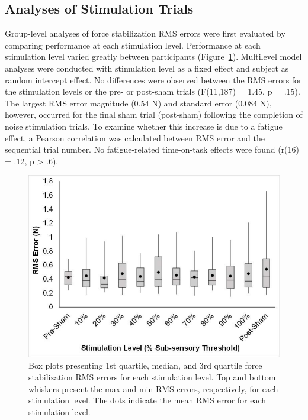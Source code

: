 \documentclass[]{cik}%
\begin{document}
\hypertarget{analyses-of-stimulation-trials}{%
\subsection{Analyses of Stimulation
Trials}\label{analyses-of-stimulation-trials}}

Group-level analyses of force stabilization RMS errors were first
evaluated by comparing performance at each stimulation level.
Performance at each stimulation level varied greatly between
participants (Figure~\ref{fig-3}). Multilevel model analyses were
conducted with stimulation level as a fixed effect and subject as random
intercept effect. No differences were observed between the RMS errors
for the stimulation levels or the pre- or post-sham trials (F(11,187) =
1.45, p = .15). The largest RMS error magnitude (0.54 N) and standard
error (0.084 N), however, occurred for the final sham trial (post-sham)
following the completion of noise stimulation trials. To examine whether
this increase is due to a fatigue effect, a Pearson correlation was
calculated between RMS error and the sequential trial number. No
fatigue-related time-on-task effects were found (r(16) = .12, p
\textgreater{} .6).

\begin{figure}

{\centering \includegraphics[width=1\textwidth,height=\textheight]{./figures/fig3.pdf}

}

\caption{\label{fig-3}Box plots presenting 1st quartile, median, and 3rd
quartile force stabilization RMS errors for each stimulation level. Top
and bottom whiskers present the max and min RMS errors, respectively,
for each stimulation level. The dots indicate the mean RMS error for
each stimulation level.}

\end{figure}
\end{document}
